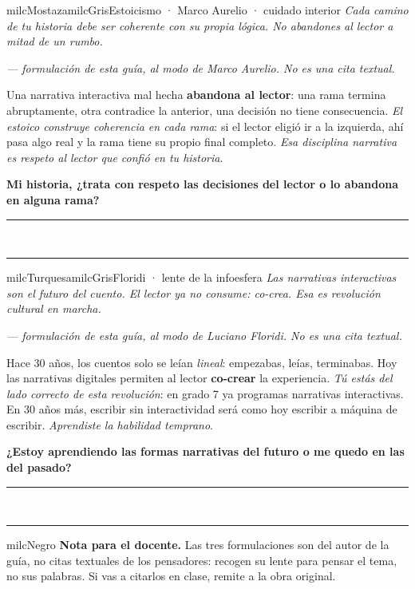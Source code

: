 \documentclass[11pt,letterpaper]{article}
\newcommand{\linead}[1]{\noindent\color{milcLinea}\rule{#1}{0.5pt}\color{milcNegro}}
\begin{document}
\begin{softbox}{milcMostaza}{milcGris}{Estoicismo · Marco Aurelio · cuidado interior}
\textit{Cada camino de tu historia debe ser coherente con su propia lógica. No abandones al lector a mitad de un rumbo.}

{\footnotesize\itshape\color{milcNegro!70}--- formulación de esta guía, al modo de Marco Aurelio. No es una cita textual.}

Una narrativa interactiva mal hecha \textbf{abandona al lector}: una rama termina abruptamente, otra contradice la anterior, una decisión no tiene consecuencia. \emph{El estoico construye coherencia en cada rama}: si el lector eligió ir a la izquierda, ahí pasa algo real y la rama tiene su propio final completo. \emph{Esa disciplina narrativa es respeto al lector que confió en tu historia}.

\textbf{Mi historia, ¿trata con respeto las decisiones del lector o lo abandona en alguna rama?}
\end{softbox}
\linead{\linewidth}\\[1mm]
\linead{\linewidth}

\begin{softbox}{milcTurquesa}{milcGris}{Floridi · lente de la infoesfera}
\textit{Las narrativas interactivas son el futuro del cuento. El lector ya no consume: co-crea. Esa es revolución cultural en marcha.}

{\footnotesize\itshape\color{milcNegro!70}--- formulación de esta guía, al modo de Luciano Floridi. No es una cita textual.}

Hace 30 años, los cuentos solo se leían \emph{lineal}: empezabas, leías, terminabas. Hoy las narrativas digitales permiten al lector \textbf{co-crear} la experiencia. \emph{Tú estás del lado correcto de esta revolución}: en grado 7 ya programas narrativas interactivas. En 30 años más, escribir sin interactividad será como hoy escribir a máquina de escribir. \emph{Aprendiste la habilidad temprano}.

\textbf{¿Estoy aprendiendo las formas narrativas del futuro o me quedo en las del pasado?}
\end{softbox}
\linead{\linewidth}\\[1mm]
\linead{\linewidth}

\begin{infoband}{milcNegro}
\textbf{Nota para el docente.} Las tres formulaciones son del autor de la guía, no citas textuales de los pensadores: recogen su lente para pensar el tema, no sus palabras. Si vas a citarlos en clase, remite a la obra original.
\end{infoband}
\end{document}
